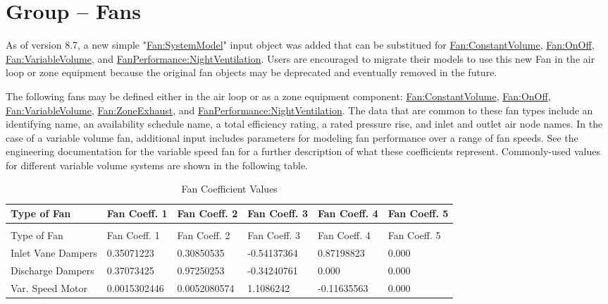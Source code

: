 \section{Group -- Fans}\label{group-fans}

As of version 8.7, a new simple "\hyperref[fansystemmodel]{Fan:SystemModel}" input object was added that can be substitued for \hyperref[fanconstantvolume]{Fan:ConstantVolume}, \hyperref[fanonoff]{Fan:OnOff}, \hyperref[fanvariablevolume]{Fan:VariableVolume}, and \hyperref[fanperformancenightventilation]{FanPerformance:NightVentilation}.  Users are encouraged to migrate their models to use this new Fan in the air loop or zone equipment because the original fan objects may be deprecated and eventually removed in the future.

The following fans may be defined either in the air loop or as a zone equipment component: \hyperref[fanconstantvolume]{Fan:ConstantVolume}, \hyperref[fanonoff]{Fan:OnOff}, \hyperref[fanvariablevolume]{Fan:VariableVolume}, \hyperref[fanzoneexhaust]{Fan:ZoneExhaust}, and \hyperref[fanperformancenightventilation]{FanPerformance:NightVentilation}. The data that are common to these fan types include an identifying name, an availability schedule name, a total efficiency rating, a rated pressure rise, and inlet and outlet air node names. In the case of a variable volume fan, additional input includes parameters for modeling fan performance over a range of fan speeds. See the engineering documentation for the variable speed fan for a further description of what these coefficients represent. Commonly-used values for different variable volume systems are shown in the following table.

\begin{longtable}[c]{p{1.0in}p{1.0in}p{1.0in}p{1.0in}p{1.0in}p{1.0in}}
\caption{Fan Coefficient Values \label{table:fan-coefficient-values}} \tabularnewline
\toprule
Type of Fan & Fan Coeff. 1 & Fan Coeff. 2 & Fan Coeff. 3 & Fan Coeff. 4 & Fan Coeff. 5 \tabularnewline
\midrule
\endfirsthead

\caption[]{Fan Coefficient Values} \tabularnewline
\toprule
Type of Fan & Fan Coeff. 1 & Fan Coeff. 2 & Fan Coeff. 3 & Fan Coeff. 4 & Fan Coeff. 5 \tabularnewline
\midrule
\endhead

Inlet Vane Dampers & 0.35071223 & 0.30850535 & -0.54137364 & 0.87198823 & 0.000 \tabularnewline
Discharge Dampers & 0.37073425 & 0.97250253 & -0.34240761 & 0.000 & 0.000 \tabularnewline
Var. Speed Motor & 0.0015302446 & 0.0052080574 & 1.1086242 & -0.11635563 & 0.000 \tabularnewline
\bottomrule
\end{longtable}

